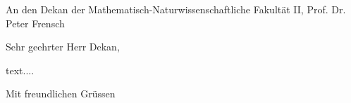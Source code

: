 \documentclass[fontsize=11pt, paper=a4]{scrlttr2}
\begin{document}
\begin{letter}{An den Dekan der Mathematisch-Naturwissenschaftliche Fakult\"at II,
Prof. Dr. Peter Frensch}
\opening{Sehr geehrter Herr Dekan,}
text....
\closing{Mit freundlichen Gr\"ussen}
\end{letter}
\end{document}
